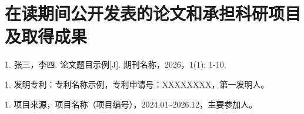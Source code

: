 \chapter*{在读期间公开发表的论文和承担科研项目及取得成果}


1. 张三，李四. 论文题目示例[J]. 期刊名称，2026，1(1): 1-10.


1. 发明专利：专利名称示例，专利申请号：XXXXXXXX，第一发明人。


1. 项目来源，项目名称（项目编号），2024.01--2026.12，主要参加人。
